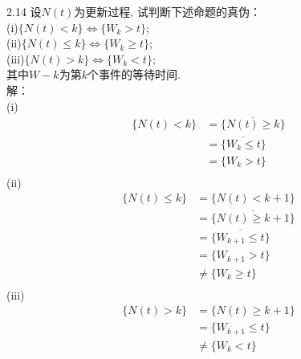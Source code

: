 2.14 设$N(t)$为更新过程, 试判断下述命题的真伪：\\
(i)$\{N(t) < k \} \Longleftrightarrow \{W_k > t\}$;\\
(ii)$\{N(t) \leqslant k \} \Longleftrightarrow \{W_k \geqslant t\}$;\\
(iii)$\{N(t) > k \} \Longleftrightarrow \{W_k < t\}$;\\
其中$W-k$为第$k$个事件的等待时间.\\
解：\\
(i)\[
	\begin{split}
	\{N(t) < k \} & = \overline{\{N(t) \geqslant k\}}\\
	 			& = \overline{\{W_k \leqslant t\}}\\
				& = \{W_k > t\}\\
	\end{split}
	\]
(ii)\[
	\begin{split}
	\{N(t) \leqslant k \} & = \{N(t) < k + 1\}\\
				& = \overline{\{N(t) \geqslant k + 1\}}\\
				& = \overline{\{W_{k+1} \leqslant t\}}\\
				& = \{W_{k+1} > t\}\\
				& \neq \{W_k \geqslant t\}\\
	\end{split}
	\]
(iii)\[
	\begin{split}
	\{N(t) > k \} & = \{N(t) \geqslant k+1\}\\
				& = \{W_{k+1} \leqslant t\}\\
				& \neq \{W_k < t\}\\
	\end{split}
	\]


